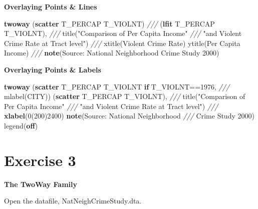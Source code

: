 \documentclass[]{book}
\newenvironment{Shaded}{\begin{snugshade}}{\end{snugshade}}
\newcommand{\BaseNTok}[1]{\textcolor[rgb]{0.00,0.00,0.81}{#1}}
\newcommand{\CommentTok}[1]{\textcolor[rgb]{0.56,0.35,0.01}{\textit{#1}}}
\newcommand{\KeywordTok}[1]{\textcolor[rgb]{0.13,0.29,0.53}{\textbf{#1}}}
\newcommand{\NormalTok}[1]{#1}
\newcommand{\StringTok}[1]{\textcolor[rgb]{0.31,0.60,0.02}{#1}}
\begin{document}
\textbf{Overlaying Points \& Lines}

\begin{Shaded}
\begin{Highlighting}[]
  \KeywordTok{twoway}\NormalTok{ (}\KeywordTok{scatter}\NormalTok{ T_PERCAP T_VIOLNT) }\CommentTok{///}
\NormalTok{      (}\KeywordTok{lfit}\NormalTok{ T_PERCAP T_VIOLNT), }\CommentTok{///}
      \BaseNTok{title}\NormalTok{(}\StringTok{"Comparison of Per Capita Income"} \CommentTok{///}
            \StringTok{"and Violent Crime Rate at Tract level"}\NormalTok{) }\CommentTok{///}
      \BaseNTok{xtitle}\NormalTok{(Violent Crime Rate) }\BaseNTok{ytitle}\NormalTok{(Per Capita Income) }\CommentTok{///}
      \KeywordTok{note}\NormalTok{(Source: National  Neighborhood Crime Study 2000)}
\end{Highlighting}
\end{Shaded}

\textbf{Overlaying Points \& Labels}

\begin{Shaded}
\begin{Highlighting}[]
  \KeywordTok{twoway}\NormalTok{ (}\KeywordTok{scatter}\NormalTok{ T_PERCAP T_VIOLNT }\KeywordTok{if}\NormalTok{ T_VIOLNT==1976, }\CommentTok{///}
          \BaseNTok{mlabel}\NormalTok{(CITY)) (}\KeywordTok{scatter}\NormalTok{ T_PERCAP T_VIOLNT), }\CommentTok{///}
      \BaseNTok{title}\NormalTok{(}\StringTok{"Comparison of Per Capita Income"} \CommentTok{///}
            \StringTok{"and Violent Crime Rate at Tract level"}\NormalTok{) }\CommentTok{///}
      \KeywordTok{xlabel}\NormalTok{(0(200)2400) }\KeywordTok{note}\NormalTok{(Source: National Neighborhood }\CommentTok{///}
\NormalTok{                              Crime Study 2000) }\BaseNTok{legend}\NormalTok{(}\KeywordTok{off}\NormalTok{)}
\end{Highlighting}
\end{Shaded}

\hypertarget{exercise-3-5}{%
\section{Exercise 3}\label{exercise-3-5}}

\textbf{The TwoWay Family}

Open the datafile, NatNeighCrimeStudy.dta.
\end{document}
